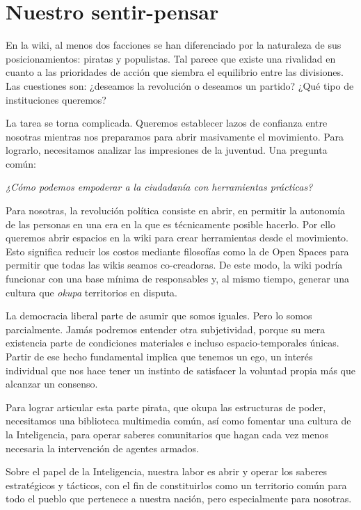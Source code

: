 \hypertarget{nuestro-sentir-pensar}{%
\section{Nuestro sentir-pensar}\label{nuestro-sentir-pensar}}

En la wiki, al menos dos facciones se han diferenciado por la naturaleza
de sus posicionamientos: piratas y populistas. Tal parece que existe una
rivalidad en cuanto a las prioridades de acción que siembra el
equilibrio entre las divisiones. Las cuestiones son: ¿deseamos la
revolución o deseamos un partido? ¿Qué tipo de instituciones queremos?

La tarea se torna complicada. Queremos establecer lazos de confianza
entre nosotras mientras nos preparamos para abrir masivamente el
movimiento. Para lograrlo, necesitamos analizar las impresiones de la
juventud. Una pregunta común:

\emph{¿Cómo podemos empoderar a la ciudadanía con herramientas
prácticas?}

Para nosotras, la revolución política consiste en abrir, en permitir la
autonomía de las personas en una era en la que es técnicamente posible
hacerlo. Por ello queremos abrir espacios en la wiki para crear
herramientas desde el movimiento. Esto significa reducir los costos
mediante filosofías como la de Open
Spaces \cite{Wikipedia2023b} para permitir que todas las
wikis seamos co-creadoras. De este modo, la wiki podría funcionar con
una base mínima de responsables y, al mismo tiempo, generar una cultura
que \emph{okupa} territorios en disputa.

La democracia liberal parte de asumir que somos iguales. Pero lo somos
parcialmente. Jamás podremos entender otra subjetividad, porque su mera
existencia parte de condiciones materiales e incluso espacio-temporales
únicas. Partir de ese hecho fundamental implica que tenemos un ego, un
interés individual que nos hace tener un instinto de satisfacer la
voluntad propia más que alcanzar un consenso.

Para lograr articular esta parte pirata, que okupa las estructuras de
poder, necesitamos una biblioteca multimedia común, así como fomentar
una cultura de la Inteligencia, para operar saberes comunitarios que
hagan cada vez menos necesaria la intervención de agentes armados.

Sobre el papel de la Inteligencia, nuestra labor es abrir y operar los
saberes estratégicos y tácticos, con el fin de constituirlos como un
territorio común para todo el pueblo que pertenece a nuestra nación,
pero especialmente para nosotras.

